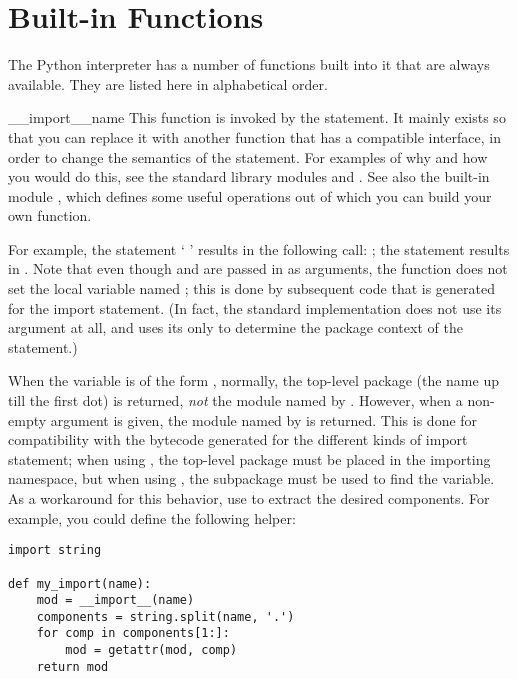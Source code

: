 \section{Built-in Functions \label{built-in-funcs}}

The Python interpreter has a number of functions built into it that
are always available.  They are listed here in alphabetical order.



\begin{funcdesc}{__import__}{name}
This function is invoked by the
 statement.  It mainly
exists so that you can replace it with another function that has a
compatible interface, in order to change the semantics of the
 statement.  For examples of why and how you would do
this, see the standard library modules
 and
.  See also the built-in module
, which defines some useful
operations out of which you can build your own
 function.

For example, the statement ` ' results in the
following call:
  ;
the statement    results
in   
\code{['eggs'])}.
Note that even though  and \code{['eggs']} are passed
in as arguments, the  function does not set the
local variable named ; this is done by subsequent code that
is generated for the import statement.  (In fact, the standard
implementation does not use its  argument at all, and uses
its  only to determine the package context of the
 statement.)

When the  variable is of the form ,
normally, the top-level package (the name up till the first dot) is
returned, \emph{not} the module named by .  However, when a
non-empty  argument is given, the module named by
 is returned.  This is done for compatibility with the
bytecode generated for the different kinds of import statement; when
using , the top-level package 
must be placed in the importing namespace, but when using , the  subpackage must be used to
find the  variable.
As a workaround for this behavior, use  to extract
the desired components.  For example, you could define the following
helper:

\begin{verbatim}
import string

def my_import(name):
    mod = __import__(name)
    components = string.split(name, '.')
    for comp in components[1:]:
        mod = getattr(mod, comp)
    return mod
\end{verbatim}

\end{funcdesc}

